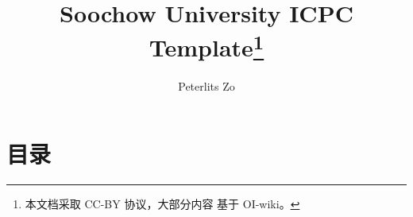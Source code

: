 \documentclass[a4paper, 9pt]{ctexbook}
\title{Soochow University ICPC Template\thanks{本文档采取 CC-BY 协议，大部分内容
基于 OI-wiki。}}
\author{Peterlits Zo}
\begin{document}
\maketitle

\twocolumn
\chapter*{目录}
\tableofcontents
\newpage
















\end{document}
